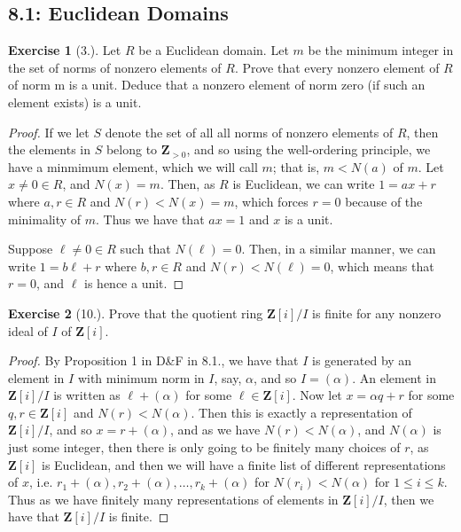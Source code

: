 \documentclass[9pt,reqno]{amsart}
\theoremstyle{definition}
\newtheorem{exercise}{Exercise}[section]
\newcommand{\zz}{\mathbf Z}
\begin{document}
\subsection{8.1: Euclidean Domains}
\begin{exercise}[3.]
Let $R$ be a Euclidean domain. Let $m$ be the minimum integer in the set of norms of nonzero elements of $R$. Prove that every nonzero element of $R$ of norm m is a unit. Deduce that a nonzero element of norm zero (if such an element exists) is a unit.	
\end{exercise}
\begin{proof}
	If we let $S$ denote the set of all all norms of nonzero elements of $R$, then the elements in $S$ belong to $\zz_{> 0}$, and so using the well-ordering principle, we have a minmimum element, which we will call $m$; that is, $m< N(a)$ of $m$.  Let $x \neq 0 \in R$, and $N(x) = m$. Then, as $R$ is Euclidean, we can write $1 = ax + r$ where $a, r \in R$ and $N(r) < N(x) = m$, which forces $r = 0$ because of the minimality of $m$. Thus we have that $ax = 1$ and $x$ is a unit. 
	
	Suppose $\ell \neq 0 \in R$ such that $N(\ell ) = 0$.  Then, in a similar manner, we can write $1 = b \ell + r$ where $b, r \in R$ and $N(r) < N(\ell) = 0$, which means that $r = 0$, and $\ell $ is hence a unit. 
\end{proof}


\begin{exercise}[10.]
	Prove that the quotient ring $\zz[i]/I$ is finite for any nonzero ideal of $I$ of $\zz[i]$.
\end{exercise}
\begin{proof}
	By Proposition 1 in D\&F in 8.1., we have that $I$ is generated by an element in $I$ with  minimum norm in $I$, say, $\alpha$, and so $I= (\alpha)$. An element in $\zz[i]/ I$ is written as $\ell + (\alpha)$ for some $\ell  \in \zz[i]$. Now let $x = \alpha q + r$ for some $q, r \in \zz[i]$ and $N(r) < N(\alpha)$. Then this is exactly a representation of $\zz[i]/ I$, and so $x = r+ (\alpha)$, and as we have $N(r) < N(\alpha)$, and $N(\alpha)$ is just some integer, then there is only going to be finitely many choices of $r$, as $\zz[i]$ is Euclidean, and then we will have a finite list of different representations of $x$, i.e. $r_1 + (\alpha), r_2 + (\alpha), \ldots, r_k + (\alpha )$ for $N(r_i) < N(\alpha)$ for $1 \leq i \leq k$. Thus as we have finitely many representations of elements in $\zz[i]/I$, then we have that $\zz[i]/I$ is finite. 
\end{proof}
\end{document}
